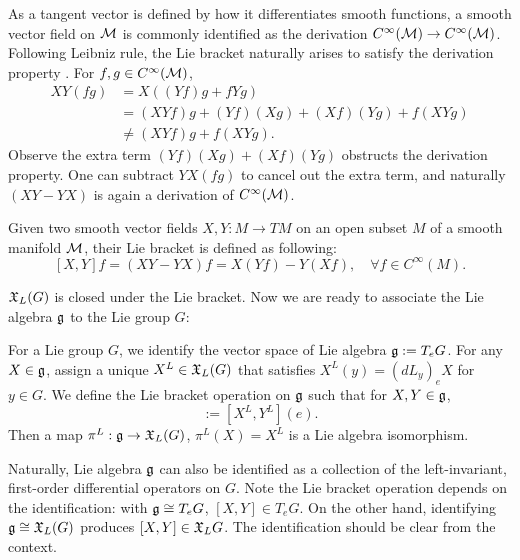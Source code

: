 As a tangent vector is defined by how it differentiates smooth functions,
a smooth vector field on $\mathcal{M}$
is commonly identified as the derivation $C^{\infty}(\mathcal{M}) \to C^{\infty}(\mathcal{M})$.
Following Leibniz rule,
the Lie bracket naturally arises to satisfy the derivation property \cite{tu2008manifold}.
For $f, g \in C^{\infty}(\mathcal{M})$,
\begin{align*}
    XY(fg) &= X((Yf)g + fYg) \\
    &= (XYf)g + (Yf)(Xg) + (Xf)(Yg) + f(XYg) \\
    &\neq (XYf)g + f(XYg).
\end{align*}
Observe the extra term $(Yf)(Xg) + (Xf)(Yg)$ obstructs the derivation property.
One can subtract $YX(fg)$ to cancel out the extra term,
and naturally $(XY-YX)$ is again a derivation of $C^{\infty}(\mathcal{M})$.
\begin{definition}
    Given two smooth vector fields $X, Y: M \to TM$ on an open subset $M$ of a smooth manifold $\mathcal{M}$,
    their Lie bracket is defined as following:
    \begin{equation}
    \label{app:eq_LieBracketDef}
        [X,Y] f = (XY - YX)f = X(Yf) - Y(Xf), \quad \forall f \in C^\infty(M).
    \end{equation}
\end{definition}
$\mathfrak{X}_L(G)$ is closed under the Lie bracket.
Now we are ready to associate the Lie algebra $\mathfrak{g}$ to the Lie group $G$:
\begin{definition}
\label{app:LieAlgebra_Tangent}
    For a Lie group $G$, we identify the vector space of Lie algebra $\mathfrak{g}:=T_eG$.
    For any $X \in \mathfrak{g}$, assign a unique $X^L \in \mathfrak{X}_L(G)$ that satisfies $X^L(y) = (dL_y)_eX$ for $y \in G$.
    We define the Lie bracket operation on $\mathfrak{g}$ such that for $X,Y \in \mathfrak{g}$,
    \begin{equation*}
        [X,Y] := [X^L,Y^L](e).
    \end{equation*}
    Then a map $\pi^L:\mathfrak{g} \to \mathfrak{X}_L(G)$, $\pi^L(X) = X^L$ is a Lie algebra isomorphism.
\end{definition}
Naturally, Lie algebra $\mathfrak{g}$ can also be identified as a collection of the left-invariant, first-order differential operators on $G$.
Note the Lie bracket operation depends on the identification: with $\mathfrak{g} \cong T_eG$, $[X,Y] \in T_eG$.
On the other hand, identifying $\mathfrak{g} \cong \mathfrak{X}_L(G)$ produces $[X,Y] \in \mathfrak{X}_LG$.
The identification should be clear from the context.

